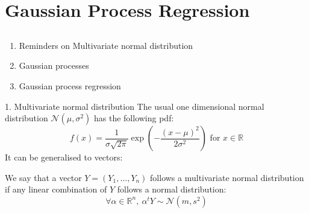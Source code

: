 \documentclass{beamer}
\begin{document}
\section[Gaussian Process regression]{Gaussian Process Regression}
\subsection{}
\begin{frame}{}
\vspace{0.75cm}
\vspace{0.5cm}
\begin{enumerate}
    \item Reminders on Multivariate normal distribution
    \item Gaussian processes
    \item Gaussian process regression
\end{enumerate}
\end{frame}


\begin{frame}{1. Multivariate normal distribution}
The usual one dimensional normal distribution $\mathcal{N}(\mu,\sigma^2)$ has the following pdf:
\begin{equation*}
f(x) = \frac{1}{\sigma \sqrt{2 \pi}} \exp \left(-\frac{(x-\mu)^2}{2 \sigma^2} \right) \text{ for } x \in \mathds{R}
\end{equation*} 
It can be generalised to vectors:
\begin{definition}
	We say that a vector $Y=(Y_1, \dots, Y_n)$ follows a multivariate normal distribution if any linear combination of $Y$ follows a normal distribution:
	\begin{equation*}
		\forall \alpha \in \mathds{R}^n,\ \alpha^t Y \sim \mathcal{N}(m,s^2)
	\end{equation*}
\end{definition}
\end{frame}
\end{document}
